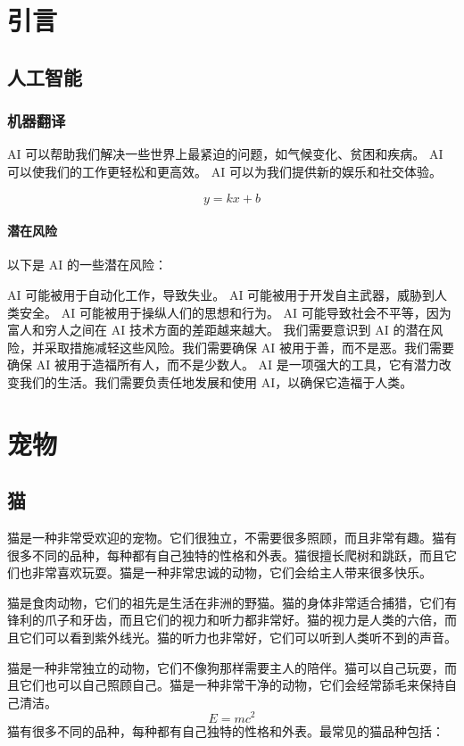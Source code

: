 \documentclass[engineeringmaster]{hquThesis}
\begin{document}
\makecover


\frontmatter{
    
    \tableofcontents
}
\mainmatter
\chapter{引言}
\section{人工智能}
\subsection{机器翻译}
AI 可以帮助我们解决一些世界上最紧迫的问题，如气候变化、贫困和疾病。
AI 可以使我们的工作更轻松和更高效。
AI 可以为我们提供新的娱乐和社交体验。

\begin{equation}
y = kx + b
\end{equation}
\subsubsection{潜在风险}
以下是 AI 的一些潜在风险：

AI 可能被用于自动化工作，导致失业。
AI 可能被用于开发自主武器，威胁到人类安全。
AI 可能被用于操纵人们的思想和行为。
AI 可能导致社会不平等，因为富人和穷人之间在 AI 技术方面的差距越来越大。
我们需要意识到 AI 的潜在风险，并采取措施减轻这些风险。我们需要确保 AI 被用于善，而不是恶。我们需要确保 AI 被用于造福所有人，而不是少数人。
AI 是一项强大的工具，它有潜力改变我们的生活。我们需要负责任地发展和使用 AI，以确保它造福于人类。

\chapter{宠物}
\section{猫}
猫是一种非常受欢迎的宠物。它们很独立，不需要很多照顾，而且非常有趣。猫有很多不同的品种，每种都有自己独特的性格和外表。猫很擅长爬树和跳跃，而且它们也非常喜欢玩耍。猫是一种非常忠诚的动物，它们会给主人带来很多快乐。

猫是食肉动物，它们的祖先是生活在非洲的野猫。猫的身体非常适合捕猎，它们有锋利的爪子和牙齿，而且它们的视力和听力都非常好。猫的视力是人类的六倍，而且它们可以看到紫外线光。猫的听力也非常好，它们可以听到人类听不到的声音。

猫是一种非常独立的动物，它们不像狗那样需要主人的陪伴。猫可以自己玩耍，而且它们也可以自己照顾自己。猫是一种非常干净的动物，它们会经常舔毛来保持自己清洁。
\begin{equation}
E = mc^2
\end{equation}
猫有很多不同的品种，每种都有自己独特的性格和外表。最常见的猫品种包括：
\end{document}
